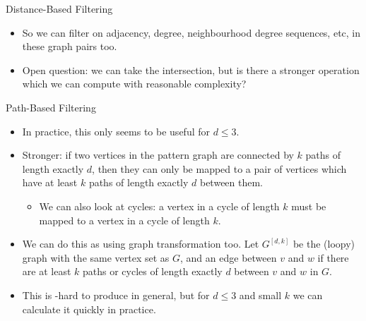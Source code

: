 \documentclass{beamer}
\begin{document}
\begin{frame}{Distance-Based Filtering}
{\begin{itemize}
            \item So we can filter on adjacency, degree, neighbourhood degree sequences, etc, in
                these graph pairs too.

            \item Open question: we can take the intersection, but is there a stronger operation
                which we can compute with reasonable complexity?
        \end{itemize}
    }
\end{frame}

\begin{frame}{Path-Based Filtering}
    \begin{itemize}
        \item In practice, this only seems to be useful for $d \le 3$.

        \item Stronger: if two vertices in the pattern graph are connected by $k$ paths of
            length exactly $d$, then they can only be mapped to a pair of vertices which have at
            least $k$ paths of length exactly $d$ between them.

            \begin{itemize}
                \item We can also look at cycles: a vertex in a cycle of length $k$ must be mapped to a
                    vertex in a cycle of length $k$.
            \end{itemize}

        \item We can do this as using graph transformation too. Let $G^{\left[d, k\right]}$ be the
            (loopy) graph with the same vertex set as $G$, and an edge between $v$ and $w$ if there are at
            least $k$ paths or cycles of length exactly $d$ between $v$ and $w$ in $G$.

        \item This is \NP-hard to produce in general, but for $d \le 3$ and small $k$ we can
            calculate it quickly in practice.
    \end{itemize}
\end{frame}
\end{document}
